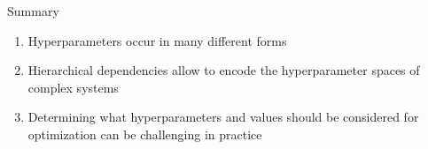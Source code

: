 \documentclass[main]{subfiles}
\begin{document}

\begin{frame}{Summary} 
\begin{enumerate}
    \item Hyperparameters occur in many different forms
    \item Hierarchical dependencies allow to encode the hyperparameter spaces of complex systems
    \item Determining what hyperparameters and values should be considered for optimization can be challenging in practice
\end{enumerate}
\end{frame}
\end{document}
